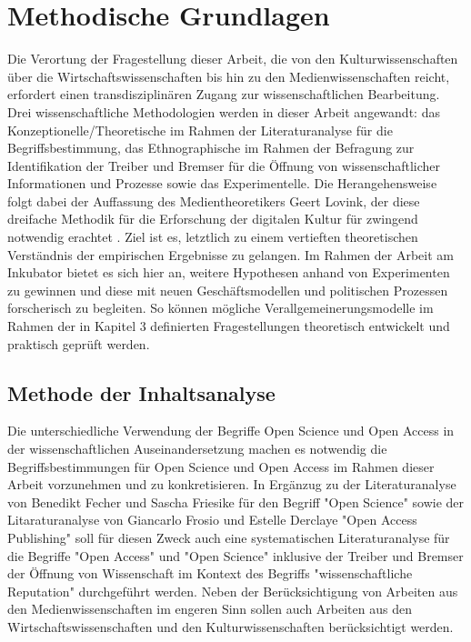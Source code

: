 \chapter{Methodische Grundlagen}
Die Verortung der Fragestellung dieser Arbeit, die von den Kulturwissenschaften über die Wirtschaftswissenschaften bis hin zu den Medienwissenschaften reicht, erfordert einen transdisziplinären Zugang zur wissenschaftlichen Bearbeitung. 
Drei wissenschaftliche Methodologien werden in dieser Arbeit angewandt: das Konzeptionelle/Theoretische im Rahmen der Literaturanalyse für die Begriffsbestimmung, das Ethnographische im Rahmen der Befragung zur Identifikation der Treiber und Bremser für die Öffnung von wissenschaftlicher Informationen und Prozesse sowie das Experimentelle. 
Die Herangehensweise folgt dabei der Auffassung des Medientheoretikers Geert Lovink, der diese dreifache Methodik für die Erforschung der digitalen Kultur für zwingend notwendig erachtet . 
Ziel ist es, letztlich zu einem vertieften theoretischen Verständnis der empirischen Ergebnisse zu gelangen. Im Rahmen der Arbeit am Inkubator bietet es sich hier an, weitere Hypothesen anhand von Experimenten zu gewinnen und diese mit neuen Geschäftsmodellen und politischen Prozessen forscherisch zu begleiten. So können mögliche Verallgemeinerungsmodelle im Rahmen der in Kapitel 3 definierten Fragestellungen theoretisch entwickelt und praktisch geprüft werden.
\section{Methode der Inhaltsanalyse}
Die unterschiedliche Verwendung der Begriffe Open Science und Open Access in der wissenschaftlichen Auseinandersetzung machen es notwendig die Begriffsbestimmungen für Open Science und Open Access im Rahmen dieser Arbeit vorzunehmen und zu konkretisieren. In Ergänzug zu der Literaturanalyse von Benedikt Fecher und Sascha Friesike für den Begriff "Open Science"\cite{cite:9} sowie der Litaraturanalyse von Giancarlo Frosio und Estelle Derclaye "Open Access Publishing" \cite{CREATe_2014} soll für diesen Zweck auch eine systematischen Literaturanalyse für die Begriffe "Open Access" und "Open Science" inklusive der Treiber und Bremser der Öffnung von Wissenschaft im Kontext des Begriffs "wissenschaftliche Reputation" durchgeführt werden. Neben der Berücksichtigung von Arbeiten aus den Medienwissenschaften im engeren Sinn sollen auch Arbeiten aus den Wirtschaftswissenschaften und den Kulturwissenschaften berücksichtigt werden.
